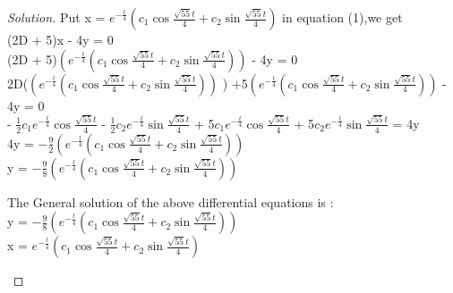 \documentclass[12pt]{article}
\begin{document}
\begin{proof}[Solution]
Put  x = $e^{-\frac{t}{4}}(c_1 \cos{\frac{\sqrt{55}t}{4}} + c_2 \sin{\frac{\sqrt{55}t}{4}}) $ in equation (1),we get \\

(2D + 5)x - 4y = 0 \\

(2D + 5)$(e^{-\frac{t}{4}}(c_1 \cos{\frac{\sqrt{55}t}{4}} + c_2 \sin{\frac{\sqrt{55}t}{4}})) $ - 4y = 0 \\

2D($(e^{-\frac{t}{4}}(c_1 \cos{\frac{\sqrt{55}t}{4}} + c_2 \sin{\frac{\sqrt{55}t}{4}})) $ ) +5$(e^{-\frac{t}{4}}(c_1 \cos{\frac{\sqrt{55}t}{4}} + c_2 \sin{\frac{\sqrt{55}t}{4}})) $ - 4y = 0\\

- $\frac{1}{2} c_1 e^{-\frac{t}{4}} \cos{\frac{\sqrt{55}t}{4}} $ - $\frac{1}{2}  c_2 e^{-\frac{t}{4}} \sin{\frac{\sqrt{55}t}{4}}$ + 5$c_1 e^{-\frac{t}{4}} \cos{\frac{\sqrt{55}t}{4}} $ + 5$ c_2 e^{-\frac{t}{4}} \sin{\frac{\sqrt{55}t}{4}}$  = 4y \\

 4y = $-\frac{9}{2}  (e^{-\frac{t}{4}}(c_1 \cos{\frac{\sqrt{55}t}{4}} + c_2 \sin{\frac{\sqrt{55}t}{4}})) $ \\
 
 y = $-\frac{9}{8}(e^{-\frac{t}{4}}(c_1 \cos{\frac{\sqrt{55}t}{4}} + c_2 \sin{\frac{\sqrt{55}t}{4}})) $ \\
 
 \begin{Large}
 The General solution of the above differential equations is : \\
 
 y = $-\frac{9}{8}(e^{-\frac{t}{4}}(c_1 \cos{\frac{\sqrt{55}t}{4}} + c_2 \sin{\frac{\sqrt{55}t}{4}})) $ \\
 
  x = $e^{-\frac{t}{4}}(c_1 \cos{\frac{\sqrt{55}t}{4}} + c_2 \sin{\frac{\sqrt{55}t}{4}}) $   \\
 \end{Large}
\end{proof}
\end{document}
